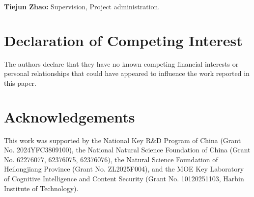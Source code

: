 \documentclass[a4paper,fleqn]{cas-dc}
\begin{document}
\textbf{Tiejun Zhao:} Supervision, Project administration.

\section*{Declaration of Competing Interest}
The authors declare that they have no known competing financial interests or personal relationships that could have appeared to influence the work reported in this paper.

\section*{Acknowledgements}
This work was supported by the National Key R\&D Program of China (Grant No. 2024YFC3809100), the National Natural Science Foundation of China (Grant No. 62276077, 62376075, 62376076), the Natural Science Foundation of Heilongjiang Province (Grant No. ZL2025F004), and the MOE Key Laboratory of Cognitive Intelligence and Content Security (Grant No. 10120251103, Harbin Institute of Technology).

\clearpage

% 




\end{document}
